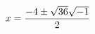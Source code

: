 \documentclass[preview]{standalone}
\begin{document}
\begin{align*}
\special{dvisvgm:raw <g id='unique000'>}x=\frac{-4\pm \sqrt{36}\sqrt{-1}}{2}\special{dvisvgm:raw </g>}
\end{align*}
\end{document}
